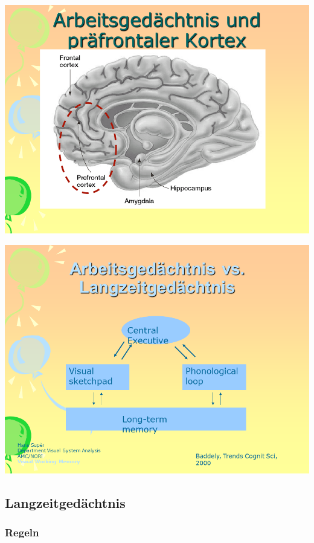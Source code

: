 \documentclass[
  letterpaper,
]{scrbook}
\begin{document}
\includegraphics[width=1\textwidth,height=\textheight]{./pictures/neuro/Diapozitiv44.PNG}

\includegraphics[width=1\textwidth,height=\textheight]{./pictures/neuro/Diapozitiv45.PNG}

\hypertarget{langzeitgeduxe4chtnis}{%
\subsection{Langzeitgedächtnis}\label{langzeitgeduxe4chtnis}}

\hypertarget{regeln}{%
\subsubsection{Regeln}\label{regeln}}
\end{document}
